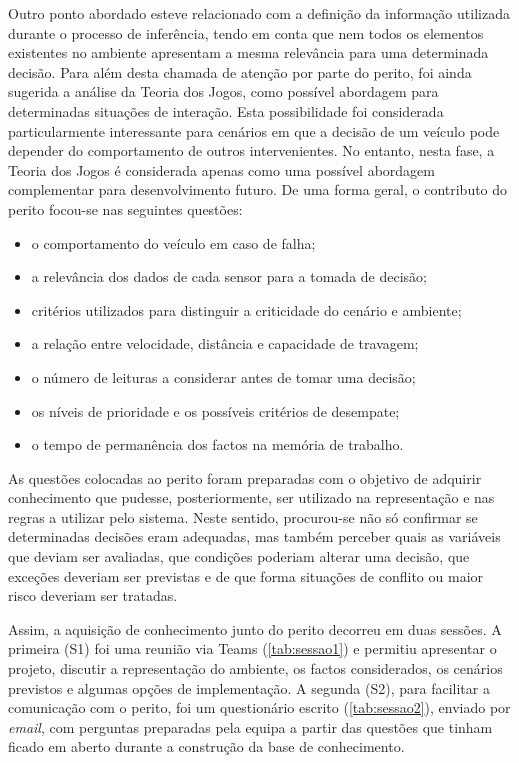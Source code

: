 Outro ponto abordado esteve relacionado com a definição da informação
utilizada durante o processo de inferência, tendo em conta que nem todos os
elementos existentes no ambiente apresentam a mesma relevância para uma
determinada decisão. Para além desta chamada de atenção por parte do perito,
foi ainda sugerida a análise da Teoria dos Jogos, como possível abordagem para
determinadas situações de interação. Esta possibilidade foi considerada
particularmente interessante para cenários em que a decisão de um veículo
pode depender do comportamento de outros intervenientes. No entanto, nesta
fase, a Teoria dos Jogos é considerada apenas como uma possível abordagem
complementar para desenvolvimento futuro. De uma forma geral, o contributo do
perito focou-se nas seguintes questões:
\begin{itemize}
  \item o comportamento do veículo em caso de falha;
  \item a relevância dos dados de cada sensor para a tomada de decisão;
  \item critérios utilizados para distinguir a criticidade do cenário e
    ambiente;
  \item a relação entre velocidade, distância e capacidade de travagem;
  \item o número de leituras a considerar antes de tomar uma decisão;
  \item os níveis de prioridade e os possíveis critérios de desempate;
  \item o tempo de permanência dos factos na memória de trabalho.
\end{itemize}

As questões colocadas ao perito foram preparadas com o objetivo de adquirir
conhecimento que pudesse, posteriormente, ser utilizado na representação e
nas regras a utilizar pelo sistema. Neste sentido, procurou-se não só
confirmar se determinadas decisões eram adequadas, mas também perceber quais
as variáveis que deviam ser avaliadas, que condições poderiam alterar uma
decisão, que exceções deveriam ser previstas e de que forma situações de
conflito ou maior risco deveriam ser tratadas.

Assim, a aquisição de conhecimento junto do perito decorreu em duas sessões.
A primeira (S1) foi uma reunião via Teams (\cref{tab:sessao1}) e permitiu
apresentar o projeto,
discutir a representação do ambiente, os factos considerados, os cenários
previstos e algumas opções de implementação. A segunda (S2), para facilitar a
comunicação com o perito, foi um questionário escrito (\cref{tab:sessao2}),
enviado por
\emph{email}, com perguntas preparadas pela equipa a partir das questões que
tinham ficado em aberto durante a construção da base de conhecimento.

